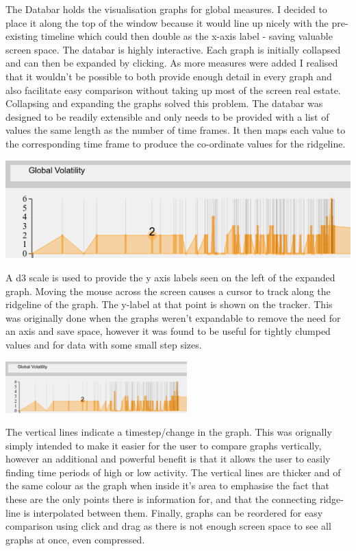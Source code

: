 The Databar holds the visualisation graphs for global measures. I decided to place it along the top of the window because it would line up nicely with the pre-existing timeline which could then double as the x-axis label - saving valuable screen space.
The databar is highly interactive. Each graph is initially collapsed and can then be expanded by clicking. As more measures were added I realised that it wouldn't be possible to both provide enough detail in every graph and also facilitate easy comparison without taking up most of the screen real estate. Collapsing and expanding the graphs solved this problem. The databar was designed to be readily extensible and only needs to be provided with a list of values the same length as the number of time frames. It then maps each value to the corresponding time frame to produce the co-ordinate values for the ridgeline. 

\begin{center}
\includegraphics[trim={0 0 0 0}, width=140mm]{./Figures/margueriteGlobalVolatility.png}
\end{center}
A d3 scale is used to provide the y axis labels seen on the left of the expanded graph. Moving the mouse across the screen causes a cursor to track along the ridgeline of the graph. The y-label at that point is shown on the tracker. This was originally done when the graphs weren't expandable to remove the need for an axis and save space, however it was found to be useful for tightly clumped values and for data with some small step sizes.

\begin{center}
\includegraphics[trim={5cm, 0, 9cm, 2cm},clip, width=70mm]{./Figures/margueriteGlobalVolatility.png}
\end{center}
The vertical lines indicate a timestep/change in the graph. This was orignally simply intended to make it easier for the user to  compare graphs vertically, however an additional and powerful benefit is that it allows the user to  easily finding time periods of high or low activity. The vertical lines are thicker and of the same colour as the graph when inside it's area to emphasise the fact that these are the only points there is information for, and that the connecting ridge-line is interpolated between them.
Finally, graphs can be reordered for easy comparison using click and drag as there is not enough screen space to see all graphs at once, even compressed.

